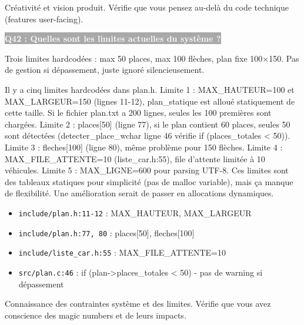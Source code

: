 \documentclass[12pt,a4paper]{article}
\newcommand{\question}[1]{%
    \vspace{0.5cm}
    \noindent\colorbox{darkgray}{\textcolor{white}{\textbf{#1}}}
    \vspace{0.3cm}
}
\begin{document}
\begin{objectif_prof}
Créativité et vision produit. Vérifie que vous pensez au-delà du code technique (features user-facing).
\end{objectif_prof}

\question{Q42 : Quelles sont les limites actuelles du système ?}

\begin{reponse_courte}
Trois limites hardcodées : max 50 places, max 100 flèches, plan fixe 100×150. Pas de gestion si dépassement, juste ignoré silencieusement.
\end{reponse_courte}

\begin{reponse_longue}
Il y a cinq limites hardcodées dans plan.h. Limite 1 : MAX\_HAUTEUR=100 et MAX\_LARGEUR=150 (lignes 11-12), plan\_statique est alloué statiquement de cette taille. Si le fichier plan.txt a 200 lignes, seules les 100 premières sont chargées. Limite 2 : places[50] (ligne 77), si le plan contient 60 places, seules 50 sont détectées (detecter\_place\_wchar ligne 46 vérifie if (places\_totales < 50)). Limite 3 : fleches[100] (ligne 80), même problème pour 150 flèches. Limite 4 : MAX\_FILE\_ATTENTE=10 (liste\_car.h:55), file d'attente limitée à 10 véhicules. Limite 5 : MAX\_LIGNE=600 pour parsing UTF-8. Ces limites sont des tableaux statiques pour simplicité (pas de malloc variable), mais ça manque de flexibilité. Une amélioration serait de passer en allocations dynamiques.
\end{reponse_longue}

\begin{reference_code}
\begin{itemize}
    \item \texttt{include/plan.h:11-12} : MAX\_HAUTEUR, MAX\_LARGEUR
    \item \texttt{include/plan.h:77, 80} : places[50], fleches[100]
    \item \texttt{include/liste\_car.h:55} : MAX\_FILE\_ATTENTE=10
    \item \texttt{src/plan.c:46} : if (plan->places\_totales < 50) - pas de warning si dépassement
\end{itemize}
\end{reference_code}

\begin{objectif_prof}
Connaissance des contraintes système et des limites. Vérifie que vous avez conscience des magic numbers et de leurs impacts.
\end{objectif_prof}
\end{document}

